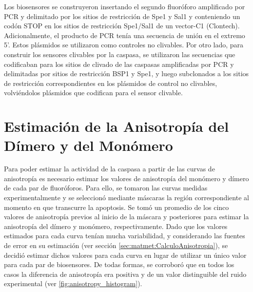 Los biosensores se construyeron insertando el segundo fluoróforo amplificado por PCR y delimitado por los sitios de restricción de Spe1 y Sal1 y conteniendo un codón STOP en los sitios de restricción Spe1/Sal1 de un vector-C1 (Clontech). Adicionalmente, el producto de PCR tenía una secuencia de unión en el extremo 5'. Estos plásmidos se utilizaron como controles no clivables. Por otro lado, para construir los sensores clivables por la caspasa, se utilizaron las secuencias que codificaban para los sitios de clivado de las caspasas amplificadas por PCR y delimitadas por sitios de restricción BSP1 y Spe1, y luego subclonados a los sitios de restricción correspondientes en los plásmidos de control no clivables, volviéndolos plásmidos que codifican para el sensor clivable.


\section{Estimación de la Anisotropía del Dímero y del Monómero}


Para poder estimar la actividad de la caspasa a partir de las curvas de anisotropía es necesario estimar los valores de anisotropía del monómero y dímero de cada par de fluoróforos. Para ello, se tomaron las curvas medidas experimentalmente y se seleccionó mediante máscaras la región correspondiente al momento en que transcurre la apoptosis. Se tomó un promedio de los cinco valores de anisotropía previos al inicio de la máscara y posteriores para estimar la anisotropía del dímero y monómero, respectivamente. Dado que los valores estimados para cada curva tenían mucha variabilidad, y considerando las fuentes de error en su estimación (ver sección \ref{sec:matmet:CalculoAnisotropia}), se decidió estimar dichos valores para cada curva en lugar de utilizar un único valor para cada par de biosensores. De todas formas, se corroboró que en todos los casos la diferencia de anisotropía era positiva y de un valor distinguible del ruido experimental (ver \cref{fig:anisotropy_histogram}).

